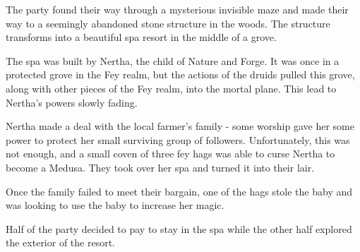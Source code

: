 The party found their way through a mysterious invisible maze and made their way to a seemingly abandoned stone structure in the woods.
The structure transforms into a beautiful spa resort in the middle of a grove.

The spa was built by Nertha, the child of Nature and Forge.
It was once in a protected grove in the Fey realm, but the actions of the druids pulled this grove, along with other pieces of the Fey realm, into the mortal plane.
This lead to Nertha's powers slowly fading.

Nertha made a deal with the local farmer's family - some worship gave her some power to protect her small surviving group of followers.
Unfortunately, this was not enough, and a small coven of three fey hags was able to curse Nertha to become a Medusa.
They took over her spa and turned it into their lair.

Once the family failed to meet their bargain, one of the hags stole the baby and was looking to use the baby to increase her magic.

Half of the party decided to pay to stay in the spa while the other half explored the exterior of the resort.
